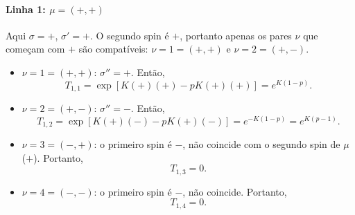 \documentclass[11pt,a4paper]{article}
\begin{document}
\paragraph{Linha 1: \(\mu = (+,+)\)}
%
Aqui \(\sigma = +\), \(\sigma' = +\). O segundo spin é \(+\), portanto apenas os pares \(\nu\) que começam com \(+\) são compatíveis: \(\nu = 1 = (+,+)\) e \(\nu = 2 = (+,-)\).
%
\begin{itemize}
    \item \(\nu = 1 = (+,+)\): \(\sigma'' = +\). Então,
    \begin{equation}
        T_{1,1} = \exp\left[ K(+)(+) - pK(+)(+) \right] = e^{K(1-p)}.
    \end{equation}
    
    \item \(\nu = 2 = (+,-)\): \(\sigma'' = -\). Então,
    \begin{equation}
        T_{1,2} = \exp\left[ K(+)(-) - pK(+)(-) \right] = e^{-K(1-p)} = e^{K(p-1)}.
    \end{equation}
    
    \item \(\nu = 3 = (-,+)\): o primeiro spin é \(-\), não coincide com o segundo spin de \(\mu\) (\(+\)). Portanto,
    \begin{equation}
        T_{1,3} = 0.
    \end{equation}
    
    \item \(\nu = 4 = (-,-)\): o primeiro spin é \(-\), não coincide. Portanto,
    \begin{equation}
        T_{1,4} = 0.
    \end{equation}
\end{itemize}
%
\end{document}
